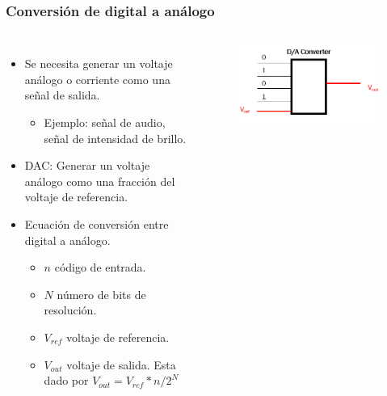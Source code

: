 \documentclass[10.5pt,scale=1.0,t,aspectratio=169,hyperref={pdfpagelabels=false}]{beamer}
\begin{document}
\begin{frame}
	\frametitle{Conversión de digital a análogo}
	\begin{columns}
		\begin{itemize}
			\setlength\itemsep{0.5cm}
			\item Se necesita generar un voltaje análogo o corriente como una señal de salida. 
			\begin{itemize}
				\item Ejemplo: señal de audio, señal de intensidad de brillo.
			\end{itemize}
			\item DAC: Generar un voltaje análogo como una fracción del voltaje de referencia.
			\item Ecuación de conversión entre digital a análogo. 
			\begin{itemize}
				\item $n$ código de entrada.
				\item $N$ número de bits de resolución.
				\item $V_{ref}$ voltaje de referencia.
				\item $V_{out}$ voltaje de salida. Esta dado por $V_{out}=V_{ref}*n/2^N$
 			\end{itemize}
		\end{itemize}
		
		{\vspace{2cm}}
		\begin{figure}
			\centering\includegraphics[scale=0.45]{fig_DACConverter}
		\end{figure}
	\end{columns}
\end{frame}
\end{document}
